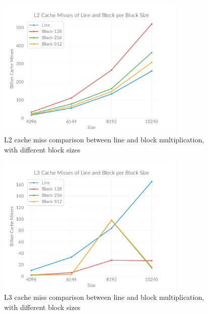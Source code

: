     \begin{figure}[h]
        \centering
        \captionsetup{justification=centering, margin=2cm}
        \includegraphics[width=0.8\textwidth]{pdf/line-block-l2}
        \caption{L2 cache miss comparison between line and block multiplication, with different block sizes}
        \label{fig:chart:line-block-l2}
    \end{figure}

    \begin{figure}[h]
        \centering
        \captionsetup{justification=centering, margin=2cm}
        \includegraphics[width=0.8\textwidth]{pdf/line-block-l3}
        \caption{L3 cache miss comparison between line and block multiplication, with different block sizes}
        \label{fig:chart:line-block-l3}
    \end{figure}

